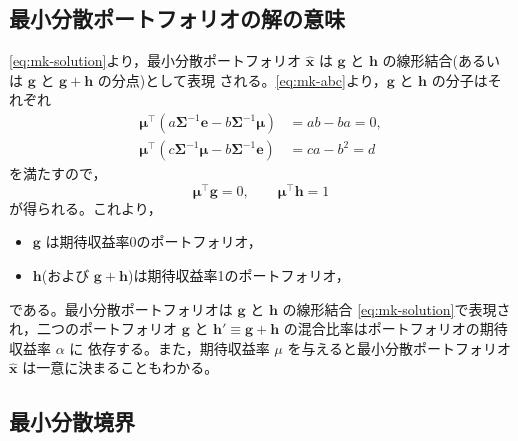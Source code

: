 \subsection{最小分散ポートフォリオの解の意味}

\eqref{eq:mk-solution}より，最小分散ポートフォリオ $\hat{\bm{x}}$ は $\bm{g}$ と
$\bm{h}$ の線形結合(あるいは $\bm{g}$ と $\bm{g}+\bm{h}$ の分点)として表現
される。\eqref{eq:mk-abc}より，$\bm{g}$ と $\bm{h}$ の分子はそれぞれ
\begin{align}
\bm{\mu}^\top(a\bm{\Sigma}^{-1}\bm{e} - b\bm{\Sigma}^{-1}\bm{\mu})
&= ab - ba = 0,\\
\bm{\mu}^\top(c\bm{\Sigma}^{-1}\bm{\mu} - b\bm{\Sigma}^{-1}\bm{e})
&= ca - b^2 = d
\end{align}
を満たすので，
\begin{equation}
\bm{\mu}^\top\bm{g} = 0,\qquad \bm{\mu}^\top\bm{h} = 1
\end{equation}
が得られる。これより，
\begin{itemize}
\item $\bm{g}$ は期待収益率0のポートフォリオ，
\item $\bm{h}$(および $\bm{g}+\bm{h}$)は期待収益率1のポートフォリオ，
\end{itemize}
である。最小分散ポートフォリオは $\bm{g}$ と $\bm{h}$ の線形結合
\eqref{eq:mk-solution}で表現され，二つのポートフォリオ $\bm{g}$ と
$\bm{h}'\equiv\bm{g}+\bm{h}$ の混合比率はポートフォリオの期待収益率 $\alpha$ に
依存する。また，期待収益率 $\mu$ を与えると最小分散ポートフォリオ $\hat{\bm{x}}$
は一意に決まることもわかる。

\subsection{最小分散境界}

